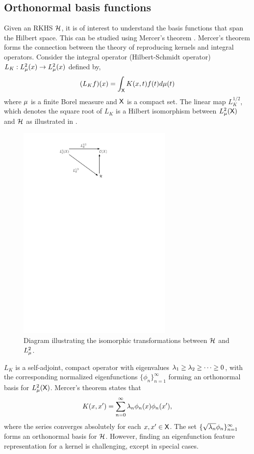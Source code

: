 \subsection{Orthonormal basis functions} 
Given an RKHS ${\cal H}$, it is of interest to understand the basis functions that span the Hilbert space. This can be studied using Mercer's theorem \cite{merrus09}. Mercer's theorem forms the connection between the theory of reproducing kernels and integral operators. 
Consider the integral operator (Hilbert-Schmidt operator) $L_K:L^2_\mu(x) \to L^2_\mu(x)$ defined by,
\begin{equation}
(L_K f)(x) = \int_{\sf X} K(x,t) f(t) d\mu(t)
\end{equation}
where $\mu$ is a finite Borel measure and ${\sf X}$ is a compact set.
The linear map $L_K^{1/2}$, which denotes the square root of $L_K$ is a Hilbert isomorphism between $L^2_{\mu}({\sf X})$ and ${\cal H}$ as illustrated in . 

\begin{figure}[htbp]
	\centering
	\includegraphics[width=3in]{images/Chap3_RKHS_isomorphism}
	\caption{Diagram illustrating the isomorphic transformations between ${\cal H}$ and $L^2_\mu$.}
	\label{fig:rkhs_isomorphism}
\end{figure}

 $L_K$ is a self-adjoint, compact operator with eigenvalues $\lambda_1 \geq \lambda_2 \geq \cdots \geq 0$, with the corresponding normalized eigenfunctions $\{\phi_n\}_{n=1}^\infty$ forming an orthonormal basis for $L^2_\mu({\sf X})$. Mercer's theorem states that 
\begin{equation}
K(x,x') = \sum_{n=0}^\infty \lambda_n \phi_n(x) \phi_n(x'),
\end{equation}
where the series converges absolutely for each $x,x' \in {\sf X}$. The set $\{\sqrt{\lambda_n}\phi_n\}_{n=1}^\infty$ forms an orthonormal basis for ${\cal H}$. However, finding an eigenfunction feature representation for a kernel is challenging, except in special cases. 

